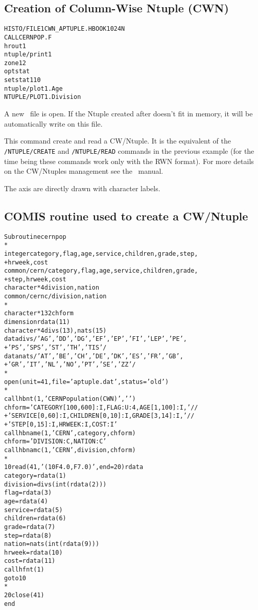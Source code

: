 \subsection*{Creation of Column-Wise Ntuple (CWN)}
\begin{alltt}
     HISTO/FILE 1 CWN_APTUPLE.HBOOK 1024 N
     CALL CERNPOP.F
      hrout 1
      ntuple/print 1
      zone 1 2
      opt stat
      set stat 110
      ntuple/plot 1.Age
     NTUPLE/PLOT 1.Division
\end{alltt}
\begin{DinglistE}
\item A new \HBOOK\ file is open. If the Ntuple created after doesn't
      fit in memory, it will be automatically write on this file.
\item This command create and read a CW/Ntuple. It is the equivalent
      of the {\tt /NTUPLE/CREATE} and {\tt /NTUPLE/READ} commands in the
      previous example (for the time being these commands work only with
      the RWN format). For more details on the CW/Ntuples management see
      the \HBOOK\ manual. 
\item The axis are directly drawn with character labels.
\end{DinglistE}
\clearpage
\subsection*{COMIS routine used to create a CW/Ntuple}
\begin{alltt}
      Subroutine cernpop
*
      integer category, flag, age, service, children, grade, step,
     +        hrweek, cost
      common /cern/ category, flag, age, service, children, grade,
     +              step, hrweek, cost
      character*4   division, nation
      common /cernc/ division, nation
*
      character*132 chform
      dimension    rdata(11)
      character*4 divs(13), nats(15)
      data divs /'AG', 'DD', 'DG', 'EF', 'EP', 'FI', 'LEP', 'PE',
     +           'PS', 'SPS', 'ST', 'TH', 'TIS'/
      data nats /'AT', 'BE', 'CH', 'DE', 'DK', 'ES', 'FR', 'GB',
     +           'GR', 'IT', 'NL', 'NO', 'PT', 'SE', 'ZZ'/
*
      open(unit=41,file='aptuple.dat',status='old')
*
      call hbnt(1,'CERN Population (CWN)',' ')
      chform = ' CATEGORY[100,600]:I, FLAG:U:4, AGE[1,100]:I,'//
     +         ' SERVICE[0,60]:I, CHILDREN[0,10]:I, GRADE[3,14]:I,'//
     +         ' STEP[0,15]:I, HRWEEK:I, COST:I'
      call hbname(1, 'CERN', category, chform)
      chform = 'DIVISION:C,           NATION:C'
      call hbnamc(1, 'CERN', division, chform)
*
10    read(41, '(10F4.0, F7.0)', end=20) rdata
      category = rdata(1)
      division = divs(int(rdata(2)))
      flag     = rdata(3)
      age      = rdata(4)
      service  = rdata(5)
      children = rdata(6)
      grade    = rdata(7)
      step     = rdata(8)
      nation   = nats(int(rdata(9)))
      hrweek   = rdata(10)
      cost     = rdata(11)
      call hfnt(1)
      goto 10
*
  20  close (41)
      end
\end{alltt} 
\clearpage
